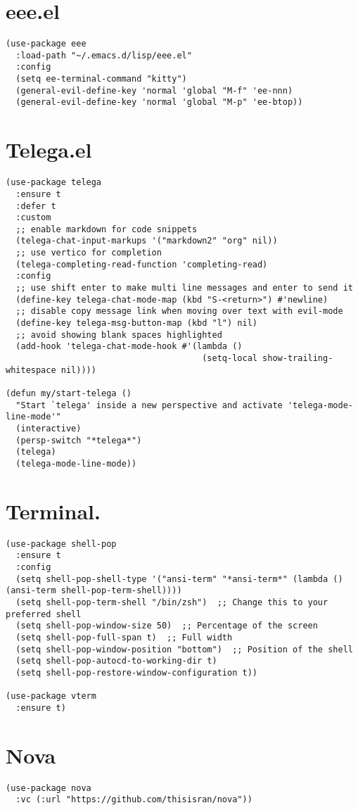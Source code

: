 \documentclass[11pt]{article}
\begin{document}
\section{eee.el}
\label{sec:org4336a3b}
\begin{verbatim}
(use-package eee
  :load-path "~/.emacs.d/lisp/eee.el"
  :config
  (setq ee-terminal-command "kitty")
  (general-evil-define-key 'normal 'global "M-f" 'ee-nnn)
  (general-evil-define-key 'normal 'global "M-p" 'ee-btop))
\end{verbatim}
\section{Telega.el}
\label{sec:orgfadd94b}
\begin{verbatim}
(use-package telega
  :ensure t
  :defer t
  :custom
  ;; enable markdown for code snippets
  (telega-chat-input-markups '("markdown2" "org" nil))
  ;; use vertico for completion
  (telega-completing-read-function 'completing-read)
  :config
  ;; use shift enter to make multi line messages and enter to send it
  (define-key telega-chat-mode-map (kbd "S-<return>") #'newline)
  ;; disable copy message link when moving over text with evil-mode
  (define-key telega-msg-button-map (kbd "l") nil)
  ;; avoid showing blank spaces highlighted
  (add-hook 'telega-chat-mode-hook #'(lambda ()
                                       (setq-local show-trailing-whitespace nil))))

(defun my/start-telega ()
  "Start `telega' inside a new perspective and activate 'telega-mode-line-mode'"
  (interactive)
  (persp-switch "*telega*")
  (telega)
  (telega-mode-line-mode))
\end{verbatim}
\section{Terminal.}
\label{sec:orgf4249a7}
\begin{verbatim}
(use-package shell-pop
  :ensure t
  :config
  (setq shell-pop-shell-type '("ansi-term" "*ansi-term*" (lambda () (ansi-term shell-pop-term-shell))))
  (setq shell-pop-term-shell "/bin/zsh")  ;; Change this to your preferred shell
  (setq shell-pop-window-size 50)  ;; Percentage of the screen
  (setq shell-pop-full-span t)  ;; Full width
  (setq shell-pop-window-position "bottom")  ;; Position of the shell
  (setq shell-pop-autocd-to-working-dir t)
  (setq shell-pop-restore-window-configuration t))

(use-package vterm
  :ensure t)
\end{verbatim}
\section{Nova}
\label{sec:org0891772}
\begin{verbatim}
(use-package nova
  :vc (:url "https://github.com/thisisran/nova"))
\end{verbatim}
\end{document}
